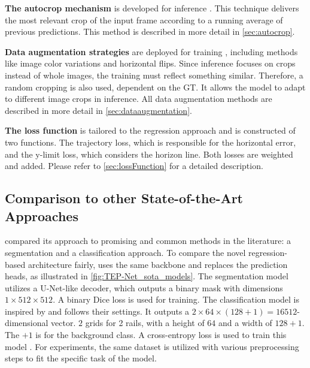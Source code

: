 \vspace{0.7cm} %

\noindent \textbf{The autocrop mechanism} is developed for inference \cite{tepNet2024}.
This technique delivers the most relevant crop of the input frame according to a running average of previous predictions.
This method is described in more detail in \autoref{sec:autocrop}.

\vspace{0.7cm} %

\noindent \textbf{Data augmentation strategies} are deployed for training \cite{tepNet2024}, including methods like image color variations and horizontal flips.
Since inference focuses on crops instead of whole images, the training must reflect something similar.
Therefore, a random cropping is also used, dependent on the \ac{GT}.
It allows the model to adapt to different image crops in inference.
All data augmentation methods are described in more detail in \autoref{sec:dataaugmentation}.

\vspace{0.7cm} %

\noindent \textbf{The loss function} is tailored to the regression approach and is constructed of two functions.
The trajectory loss, which is responsible for the horizontal error, and the y-limit loss, which considers the horizon line.
Both losses are weighted and added.
Please refer to \autoref{sec:lossFunction} for a detailed description.

\subsection{Comparison to other State-of-the-Art Approaches}

\cite{tepNet2024} compared its approach to promising and common methods in the literature: a segmentation and a classification approach.
To compare the novel regression-based architecture fairly, \cite{tepNet2024} uses the same backbone and replaces the prediction heads, as illustrated in \autoref{fig:TEP-Net_sota_models}.
The segmentation model utilizes a U-Net-like \cite{uNet2015} decoder, which outputs a binary mask with dimensions $1 \times 512 \times 512$.
A binary Dice loss is used for training.
The classification model is inspired by \cite{li2022rail} and follows their settings.
It outputs a $2 \times 64 \times (128 + 1) = 16512$-dimensional vector.
$2$ grids for 2 rails, with a height of $64$ and a width of $128+1$.
The $+1$ is for the background class.
A cross-entropy loss is used to train this model \cite{tepNet2024}.
For experiments, the same dataset is utilized with various preprocessing steps to fit the specific task of the model.

